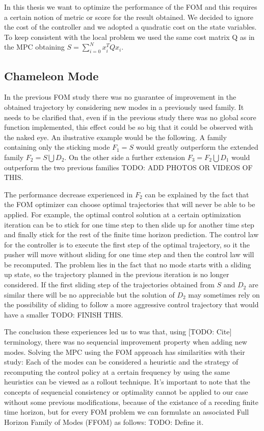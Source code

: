 \documentclass[12,twoside]{TFG-GM}
\theoremstyle{definition}
\theoremstyle{remark}
\begin{document}
In this thesis we want to optimize the performance of the FOM and this requires a certain notion of metric or score for the result obtained. We decided to ignore the cost of the controller and we adopted a quadratic cost on the state variables. To keep consistent with the local problem we used the same cost matrix Q as in the MPC obtaining $S = \sum\limits_{i = 0}^{N}{x_{i}^{T} Q x_i}$.

\subsection{Chameleon Mode}
\label{subsec:chameleon}

In the previous FOM study there was no guarantee of improvement in the obtained trajectory by considering new modes in a previously used family. It needs to be clarified that, even if in the previous study there was no global score function implemented, this effect could be so big that it could be observed with the naked eye. An ilustrative example would be the following. A family containing only the sticking mode $F_1 = S$ would greatly outperform the extended family $F_2 = S \bigcup D_2$. On the other side a further extension $F_3 = F_2 \bigcup D_1$ would outperform the two previous families TODO: ADD PHOTOS OR VIDEOS OF THIS.

The performance decrease experienced in $F_2$ can be explained by the fact that the FOM optimizer can choose optimal trajectories that will never be able to be applied. For example, the optimal control solution at a certain optimization iteration can be to stick for one time step to then slide up for another time step and finally stick for the rest of the finite time horizon prediction. The control law for the controller is to execute the first step of the optimal trajectory, so it the pusher will move without sliding for one time step and then the control law will be recomputed. The problem lies in the fact that no mode starts with a sliding up state, so the trajectory planned in the previous iteration is no longer considered. If the first sliding step of the trajectories obtained from $S$ and $D_2$ are similar there will be no appreciable but the solution of $D_2$ may sometimes rely on the possibility of sliding to follow a more aggressive control trajectory that would have a smaller TODO: FINISH THIS. 

The conclusion these experiences led us to was that, using [TODO: Cite] terminology, there was no sequencial improvement property when adding new modes.
Solving the MPC using the FOM approach has similarities with their study: Each of the modes can be considered a heuristic and the strategy of recomputing the control policy at a certain frequency by using the same heuristics can be viewed as a rollout technique. It's important to note that the concepts of sequencial consistency or optimality cannot be applied to our case without some previous modifications, because of the existance of a receding finite time horizon, but for every FOM problem we can formulate an associated Full Horizon Family of Modes (FFOM) as follows: TODO: Define it.
\end{document}
